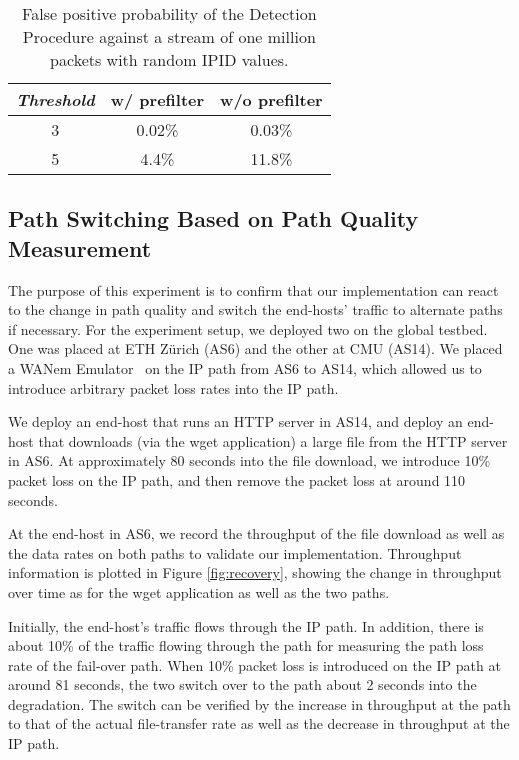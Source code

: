 \begin{table}[h]
\centering
\footnotesize
\begin{tabular}{|c|c|c|}
\hline
\textit{Threshold} & w/ prefilter & w/o prefilter \\
\hline
3 & 0.02\% & 0.03\% \\
5 & 4.4\% & 11.8\% \\
\hline
\end{tabular}
\caption{False positive probability of the \name Detection Procedure against a stream of one million packets with random IPID values.}
\label{fig:false_positive}
\end{table}

\subsection{Path Switching Based on Path Quality Measurement}

The purpose of this experiment is to confirm that our \name implementation can
react to the change in path quality and switch the end-hosts' traffic to
alternate paths if necessary. For the experiment setup, we deployed two \names
on the \scion global testbed. One was placed at ETH Z\"urich (AS6) and the
other at CMU (AS14). We placed a WANem Emulator~\cite{wanem} on the IP path
from AS6 to AS14, which allowed us to introduce arbitrary packet loss rates
into the IP path.

We deploy an end-host that runs an HTTP server in AS14, and deploy an end-host
that downloads (via the wget application) a large file from the HTTP server in
AS6. At approximately 80 seconds into the file download, we introduce 10\%
packet loss on the IP path, and then remove the packet loss at around 110
seconds.

At the end-host in AS6, we record the throughput of the file download as well
as the data rates on both paths to validate our implementation. Throughput
information is plotted in Figure \ref{fig:recovery}, showing the change in
throughput over time as for the wget application as well as the two paths.

Initially, the end-host's traffic flows through the IP path. In addition, there
is about 10\% of the traffic flowing through the \scion path for measuring the
path loss rate of the fail-over path. When 10\% packet loss is introduced on
the IP path at around 81 seconds, the two \names switch over to the \scion path
about 2 seconds into the degradation. The switch can be verified by the
increase in throughput at the \scion path to that of the actual file-transfer
rate as well as the decrease in throughput at the IP path.


